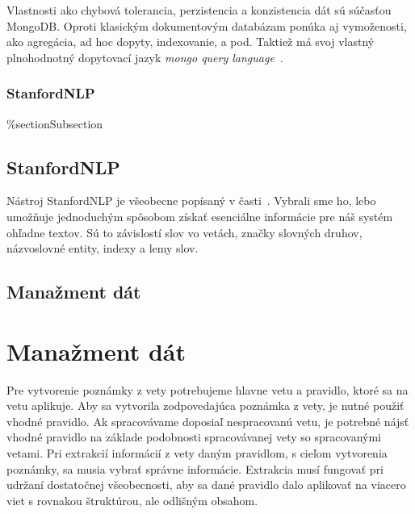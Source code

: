 Vlastnosti ako chybová tolerancia, perzistencia a konzistencia dát sú súčasťou MongoDB. Oproti klasickým dokumentovým databázam ponúka aj vymoženosti, ako agregácia, ad hoc dopyty, indexovanie, a pod. Taktiež má svoj vlastný plnohodnotný dopytovací jazyk \textit{mongo query language}~\cite{NoSQLDBvsRealtionDB}.

%
%
{
	\subsubsection{StanfordNLP}
}
{
	\%section{Subsection}
	\subsection{StanfordNLP}
}
\label{system:stanfordnlp}
Nástroj StanfordNLP je všeobecne popísaný v časti~. Vybrali sme ho, lebo umožňuje jednoduchým spôsobom získať esenciálne informácie pre náš systém ohľadne textov. Sú to závislostí slov vo vetách, značky slovných druhov, názvoslovné entity, indexy a lemy slov. 

%
%
{
	\subsection{Manažment dát}
}
{
	\section{Manažment dát}
}
\label{subsection:data_management}
Pre vytvorenie poznámky z vety potrebujeme hlavne vetu a pravidlo, ktoré sa na vetu aplikuje. Aby sa vytvorila zodpovedajúca poznámka z vety, je nutné použiť vhodné pravidlo. Ak spracovávame doposiaľ nespracovanú vetu, je potrebné nájsť vhodné pravidlo na základe podobnosti spracovávanej vety so spracovanými vetami. Pri extrakcií informácií z vety daným pravidlom, s cieľom vytvorenia poznámky, sa musia vybrať správne informácie. Extrakcia musí fungovať pri udržaní dostatočnej všeobecnosti, aby sa dané pravidlo dalo aplikovať na viacero viet s rovnakou štruktúrou, ale odlišným obsahom.

